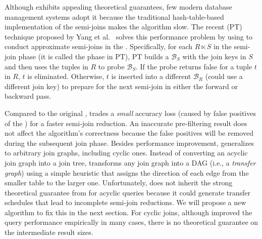 Although \YannAlg exhibits appealing theoretical guarantees, few modern database management systems adopt it because the traditional hash-table-based implementation of the semi-joins makes the algorithm slow. The recent \textbf{\PT} (PT) technique proposed by Yang et al.~\cite{yang2023PT} solves this performance problem by using \BFs to conduct approximate semi-joins in the \YannAlg. Specifically, for each $R \ensuremath{\ltimes} S$ in the semi-join phase (it is called the \PT phase in PT), PT builds a \BF $\mathcal{B}_S$ with the join keys in $S$ and then uses the tuples in $R$ to probe $\mathcal{B}_S$. If the probe returns false for a tuple $t$ in $R$, $t$ is eliminated. Otherwise, $t$ is inserted into a different \BF $\mathcal{B}_R$ (could use a different join key) to prepare for the next semi-join in either the forward or backward pass.

Compared to the original \YannAlg, \PT trades a \emph{small} accuracy loss (caused by false positives of the \BFs) for a faster semi-join reduction. An inaccurate pre-filtering result does not affect the algorithm's correctness because the false positives will be removed during the subsequent join phase. Besides performance improvement, \PT generalizes \YannAlg to arbitrary join graphs, including cyclic ones. Instead of converting an acyclic join graph into a join tree, \PT transforms any join graph into a DAG (i.e., a \emph{transfer graph}) using a simple heuristic that assigns the direction of each edge from the smaller table to the larger one. Unfortunately, \PT does not inherit the strong theoretical guarantee from \YannAlg for acyclic queries because it could generate transfer schedules that lead to incomplete semi-join reductions. We will propose a new algorithm to fix this in the next section. For cyclic joins, although \PT improved the query performance empirically in many cases, there is no theoretical guarantee on the intermediate result sizes.
